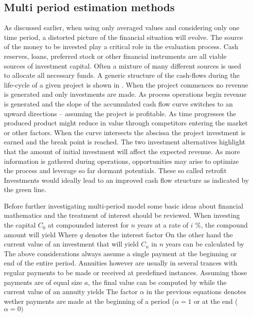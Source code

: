 \subsection{Multi period estimation methods}
\label{sec:MultiPeriod}
As discussed earlier, when using only averaged values and considering only one time period, 
a distorted picture of the financial situation will evolve. The source of the money to be invested 
play a critical role in the evaluation process. Cash reserves, loans, preferred stock or other financial 
instruments are all viable sources of investment capital. Often a mixture of many different sources is
used to allocate all necessary funds. A generic structure of the cash-flows during the life-cycle of a 
given project is shown in . When the project commences no revenue is generated 
and only investments are made. As process operations begin revenue is generated and  the slope 
of the accumulated cash flow curve switches to an upward directions -- assuming the project is profitable. 
As time progresses the produced product might reduce in value through competitors entering the market 
or other factors. When the curve intersects the abscissa the project investment is earned and the break 
point is reached. The two investment alternatives highlight that the amount of initial investment 
will affect the expected revenue. As more information is gathered during operations, opportunities 
may arise to optimize the process and leverage so far dormant potentials. These so called retrofit
Investments would ideally lead to an improved cash flow structure as indicated by the green line. 


Before further investigating multi-period model some basic ideas about financial mathematics 
and the treatment of interest should be reviewed. When investing the capital $C_0$ at compounded
interest for $n$ years at a rate of $i$ \%, the compound amount will yield
%
Where $q$ denotes the interest factor
On the other hand the current value of an investment that will yield $C_n$ in $n$ years can be calculated
by
The above considerations always assume a single payment at the beginning or end of the entire period. 
Annuities however are usually in several trances with regular payments to be made or received at 
predefined instances. Assuming those payments are of equal size $a$, the final value can be computed by
%
while the current value of an annuity yields
% 
The factor $\alpha$ in the previous equations denotes wether payments are made at the beginning 
of a period ($\alpha = 1$ or at the end ($\alpha = 0)$ 

